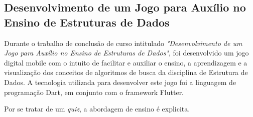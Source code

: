 \subsection{Desenvolvimento de um Jogo para Auxílio no Ensino de Estruturas de Dados}

Durante o trabalho de conclusão de curso intitulado \emph{"Desenvolvimento de um Jogo para Auxílio no Ensino de Estruturas de Dados"}, foi desenvolvido um jogo digital mobile com o intuito de facilitar e auxiliar o ensino, a aprendizagem e a visualização dos conceitos de algoritmos de busca da disciplina de Estrutura de Dados. A tecnologia utilizada para desenvolver este jogo foi a linguagem de programação Dart, em conjunto com o framework Flutter.

Por se tratar de um \emph{quiz}, a abordagem de ensino é explicita. \cite{glatz2023desenvolvimento}


